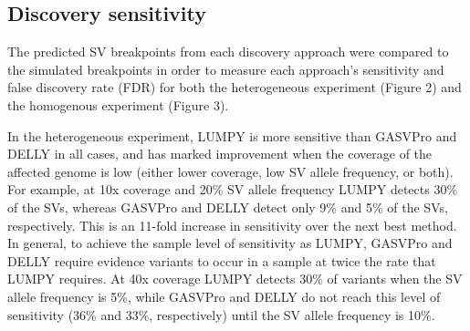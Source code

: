 \documentclass[10pt]{bmc_article}
\newenvironment{bmcformat}{\begin{raggedright}\baselineskip20pt\sloppy\setboolean{publ}{false}}{\end{raggedright}\baselineskip20pt\sloppy}
\begin{document}
\begin{bmcformat}

\subsection*{Discovery sensitivity}
The predicted SV breakpoints from each discovery approach were compared to the
simulated breakpoints in order to measure each approach’s sensitivity and false
discovery rate (FDR) for both the heterogeneous experiment (Figure 2) and the
homogenous experiment (Figure 3).

In the heterogeneous experiment, LUMPY is more sensitive than GASVPro and DELLY
in all cases, and has marked improvement when the coverage of the affected
genome is low (either lower coverage, low SV allele frequency, or both).  For
example, at 10x coverage and 20\% SV allele frequency LUMPY detects 30\% of the
SVs, whereas GASVPro and DELLY detect only 9\% and 5\% of the SVs, respectively.
This is an 11-fold increase in sensitivity over the next best method.  In
general, to achieve the sample level of sensitivity as LUMPY, GASVPro and DELLY
require evidence variants to occur in a sample at twice the rate that LUMPY
requires.  At 40x coverage LUMPY detects 30\% of variants when the SV allele
frequency is 5\%, while GASVPro and DELLY do not reach this level of sensitivity
(36\% and 33\%, respectively) until the SV allele frequency is 10\%.


\end{bmcformat}
\end{document}
